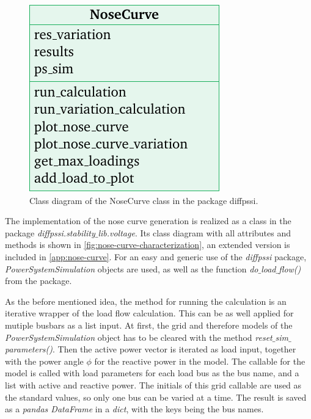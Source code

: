 \begin{figure}
        \centering
        \includegraphics[width=.9\linewidth]{tikz_graphics/images/class_diagram_nosecurve_red.pdf}
        \caption[Class diagram of the NoseCurve class in the package diffpssi]{Class diagram of the NoseCurve class in the package diffpssi.}
        \label{fig:nose-curve-characterization}
\end{figure}
The implementation of the nose curve generation is realized as a class in the package {\itshape diffpssi.stability$\_$lib.voltage}.
Its class diagram with all attributes and methods is shown in \autoref{fig:nose-curve-characterization}, an extended version is included in \autoref{app:nose-curve}.
For an easy and generic use of the {\itshape diffpssi} package, {\itshape PowerSystemSimulation} objects are used, as well as the function {\itshape do$\_$load$\_$flow()} from the package.

As the before mentioned idea, the method for running the calculation is an iterative wrapper of the load flow calculation. 
This can be as well applied for mutiple busbars as a list input.
At first, the grid and therefore models of the {\itshape PowerSystemSimulation} object has to be cleared with the method {\itshape reset$\_$sim$\_$parameters()}.
Then the active power vector is iterated as load input, together with the power angle $\phi$ for the reactive power in the model.
The callable for the model is called with load parameters for each load bus as the bus name, and a list with active and reactive power.
The initials of this grid callable are used as the standard values, so only one bus can be varied at a time.
The result is saved as a {\itshape pandas DataFrame} in a \textit{dict}, with the keys being the bus names.

